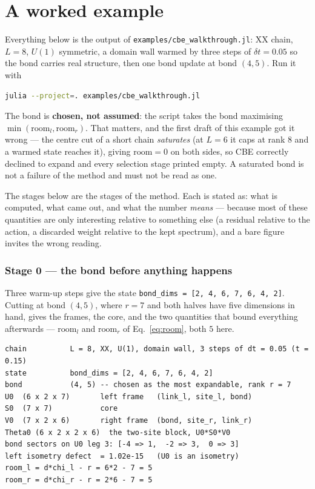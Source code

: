 \documentclass[11pt,a4paper]{article}
\newcommand{\code}[1]{\texttt{\small #1}}
\newcommand{\file}[1]{\texttt{\small #1}}
\begin{document}
\part{A worked example}
\label{part:example}

\noindent
Everything below is the output of \file{examples/cbe\_walkthrough.jl}: XX chain, $L=8$, $U(1)$
symmetric, a domain wall warmed by three steps of $\delta t = 0.05$ so the bond carries real
structure, then one bond update at bond $(4,5)$. Run it with

\begin{lstlisting}[language=bash]
julia --project=. examples/cbe_walkthrough.jl
\end{lstlisting}

\noindent
The bond is \textbf{chosen, not assumed}: the script takes the bond maximising
$\min(\mathrm{room}_l, \mathrm{room}_r)$. That matters, and the first draft of this example got
it wrong --- the centre cut of a short chain \emph{saturates} (at $L=6$ it caps at rank $8$ and a
warmed state reaches it), giving $\mathrm{room} = 0$ on both sides, so CBE correctly declined to
expand and every selection stage printed empty. A saturated bond is not a failure of the method
and must not be read as one.

The stages below are the stages of the method. Each is stated as: what is computed,
what came out, and what the number \emph{means} --- because most of these quantities are only
interesting relative to something else (a residual relative to the action, a discarded weight
relative to the kept spectrum), and a bare figure invites the wrong reading.

\section{Stage 0 --- the bond before anything happens}

Three warm-up steps give the state \code{bond\_dims = [2, 4, 6, 7, 6, 4, 2]}. Cutting at bond
$(4,5)$, where $r=7$ and both halves have five dimensions in hand, gives the frames, the core,
and the two quantities that bound everything afterwards --- $\mathrm{room}_l$ and
$\mathrm{room}_r$ of Eq.~\eqref{eq:room}, both $5$ here.

\begin{lstlisting}
chain          L = 8, XX, U(1), domain wall, 3 steps of dt = 0.05 (t = 0.15)
state          bond_dims = [2, 4, 6, 7, 6, 4, 2]
bond           (4, 5) -- chosen as the most expandable, rank r = 7
U0  (6 x 2 x 7)       left frame   (link_l, site_l, bond)
S0  (7 x 7)           core
V0  (7 x 2 x 6)       right frame  (bond, site_r, link_r)
Theta0 (6 x 2 x 2 x 6)  the two-site block, U0*S0*V0
bond sectors on U0 leg 3: [-4 => 1,  -2 => 3,  0 => 3]
left isometry defect  = 1.02e-15   (U0 is an isometry)
room_l = d*chi_l - r = 6*2 - 7 = 5
room_r = d*chi_r - r = 2*6 - 7 = 5
\end{lstlisting}
\end{document}
